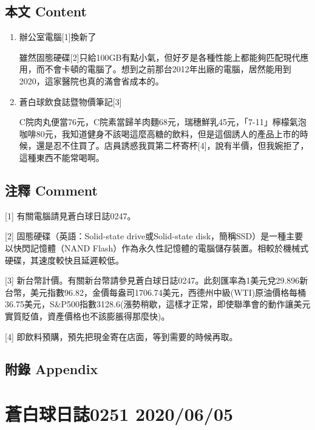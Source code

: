 \documentclass[a5paper, 11pt
]{book}
\begin{document}
\hypertarget{ux672cux6587-content-3}{%
\subsection{本文 Content}\label{ux672cux6587-content-3}}

\begin{enumerate}
\def\labelenumi{\arabic{enumi}.}
\item
  辦公室電腦{[}1{]}換新了

  雖然固態硬碟{[}2{]}只給100GB有點小氣，但好歹是各種性能上都能夠匹配現代應用，而不會卡頓的電腦了。想到之前那台2012年出廠的電腦，居然能用到2020，這家醫院也真的滿會省成本的。
\item
  蒼白球飲食誌暨物價筆記{[}3{]}

  C院肉丸便當76元，C院素當歸羊肉麵68元，瑞穗鮮乳45元，「7-11」檸檬氣泡咖啡80元，我知道健身不該喝這麼高糖的飲料，但是這個誘人的產品上市的時候，還是忍不住買了。店員誘惑我買第二杯寄杯{[}4{]}，說有半價，但我婉拒了，這種東西不能常喝啊。
\end{enumerate}

\hypertarget{ux6ce8ux91cb-comment-3}{%
\subsection{注釋 Comment}\label{ux6ce8ux91cb-comment-3}}

{[}1{]} 有關電腦請見蒼白球日誌0247。

{[}2{]} 固態硬碟（英語：Solid-state drive或Solid-state
disk，簡稱SSD）是一種主要以快閃記憶體（NAND
Flash）作為永久性記憶體的電腦儲存裝置。相較於機械式硬碟，其速度較快且延遲較低。

{[}3{]}
新台幣計價。有關新台幣請參見蒼白球日誌0247。此刻匯率為1美元兌29.896新台幣，美元指數96.82，金價每盎司1706.74美元，西德州中級(WTI)原油價格每桶36.75美元，S\&P500指數3128.6(漲勢稍歇，這樣才正常，即使聯準會的動作讓美元實質貶值，資產價格也不該膨脹得那麼快)。

{[}4{]} 即飲料預購，預先把現金寄在店面，等到需要的時候再取。

\hypertarget{ux9644ux9304-appendix-3}{%
\subsection{附錄 Appendix}\label{ux9644ux9304-appendix-3}}

\hypertarget{ux84bcux767dux7403ux65e5ux8a8c0251-20200605}{%
\section{蒼白球日誌0251
2020/06/05}\label{ux84bcux767dux7403ux65e5ux8a8c0251-20200605}}
\end{document}
